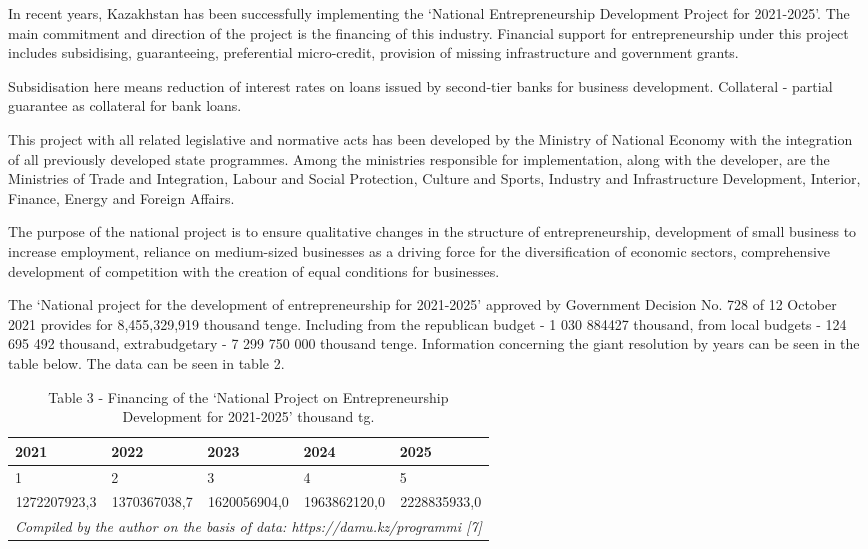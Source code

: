 \begin{multicols}{2}
In recent years, Kazakhstan has been successfully implementing the
`National Entrepreneurship Development Project for 2021-2025'. The main
commitment and direction of the project is the financing of this
industry. Financial support for entrepreneurship under this project
includes subsidising, guaranteeing, preferential micro-credit, provision
of missing infrastructure and government grants.

Subsidisation here means reduction of interest rates on loans issued by
second-tier banks for business development. Collateral - partial
guarantee as collateral for bank loans.

This project with all related legislative and normative acts has been
developed by the Ministry of National Economy with the integration of
all previously developed state programmes. Among the ministries
responsible for implementation, along with the developer, are the
Ministries of Trade and Integration, Labour and Social Protection,
Culture and Sports, Industry and Infrastructure Development, Interior,
Finance, Energy and Foreign Affairs.

The purpose of the national project is to ensure qualitative changes in
the structure of entrepreneurship, development of small business to
increase employment, reliance on medium-sized businesses as a driving
force for the diversification of economic sectors, comprehensive
development of competition with the creation of equal conditions for
businesses.

The `National project for the development of entrepreneurship for
2021-2025' approved by Government Decision No. 728 of 12 October 2021
provides for 8,455,329,919 thousand tenge. Including from the republican
budget - 1 030 884427 thousand, from local budgets - 124 695 492
thousand, extrabudgetary - 7 299 750 000 thousand tenge. Information
concerning the giant resolution by years can be seen in the table below.
The data can be seen in table 2.
\end{multicols}

\begin{table}[H]
\caption*{Table 3 - Financing of the `National Project on Entrepreneurship Development for 2021-2025' thousand tg.}
\centering
\begin{tabular}{|lllll|}
\hline
\multicolumn{1}{|l|}{2021} & \multicolumn{1}{l|}{2022} & \multicolumn{1}{l|}{2023} & \multicolumn{1}{l|}{2024} & 2025 \\ \hline
\multicolumn{1}{|l|}{1}    & \multicolumn{1}{l|}{2}    & \multicolumn{1}{l|}{3}    & \multicolumn{1}{l|}{4}    & 5    \\ \hline
\multicolumn{1}{|c|}{1272207923,3} &
  \multicolumn{1}{c|}{1370367038,7} &
  \multicolumn{1}{c|}{1620056904,0} &
  \multicolumn{1}{c|}{1963862120,0} &
  \multicolumn{1}{c|}{2228835933,0} \\ \hline
\multicolumn{5}{|l|}{\textit{Compiled by the author on the basis of data: https://damu.kz/programmi {[}7{]}}}         \\ \hline
\end{tabular}
\end{table}

